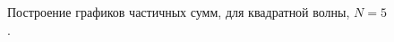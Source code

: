 \documentclass[a5paper, 10pt]{article}
\theoremstyle{definition}
\theoremstyle{plain}
\theoremstyle{remark}
\begin{document}
\begin{figure}[h]
\begin{minipage}[h]{0.5\linewidth}
\end{minipage}
\hfill
\begin{minipage}[h]{0.5\linewidth}
\end{minipage}
\caption{Построение графиков частичных сумм, для квадратной волны, $N=5$.}
\end{figure}
\end{document}
